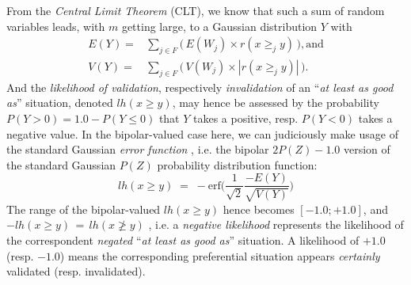 From the \emph{Central Limit Theorem} (CLT), we know that such a sum of random variables leads, with $m$ getting large, to a Gaussian distribution $Y$ with
\begin{eqnarray}
E(Y ) = &\sum_{j \in F} \big(\,E(W_j) \times r(x \geq_j y)\,\big), \text{and}\\
V(Y) = &\sum_{j \in F} \big(\,V(W_j)\times |r(x \geq_j y)|\,\big).
\end{eqnarray}
And the \emph{likelihood of validation}, respectively \emph{invalidation} of an ``\emph{at least as good as}'' situation, denoted $lh(x \geq y)$,  may hence be assessed by the probability $P(Y > 0) = 1.0 - P(Y \leq 0)$ that $Y$ takes a positive, resp. $P(Y < 0)$ takes a negative value. In the bipolar-valued case here, we can judiciously make usage of the standard Gaussian \emph{error function} , i.e. the bipolar $2P(Z) - 1.0$ version of the standard Gaussian $P(Z)$ probability distribution function:
\begin{equation}
  lh(x \geq y) \;=\; -\text{erf}\big(\frac{1}{\sqrt{2}}\frac{-E(Y)}{\sqrt{V(Y)}} \big)
\end{equation}
The range of the bipolar-valued $lh(x \geq y)$ hence becomes $[-1.0;+1.0]$, and $-lh(x \geq y) \,=\, lh(x \not\geq y)$ , i.e. a \emph{negative likelihood} represents the likelihood of the correspondent \emph{negated} ``\emph{at least as good as}'' situation. A likelihood of $+1.0$ (resp. $-1.0$) means the corresponding preferential situation appears \emph{certainly} validated (resp. invalidated).

